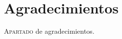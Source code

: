 \chapter*{Agradecimientos}
\pagestyle{empty}

\lettrine[lraise=-0.1, lines=2, loversize=0.25]{A}{partado} de agradecimientos.




{}%
\vspace{-.3cm}
{}%